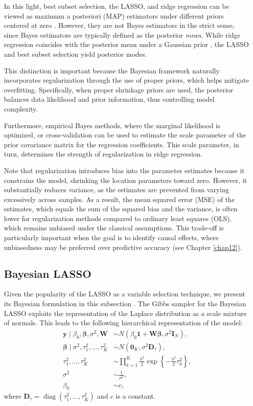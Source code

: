 In this light, best subset selection, the LASSO, and ridge regression can be viewed as maximum a posteriori (MAP) estimators under different priors centered at zero \cite{Park2008}. However, they are not Bayes estimators in the strict sense, since Bayes estimators are typically defined as the posterior \textit{mean}. While ridge regression coincides with the posterior mean under a Gaussian prior \cite{Ishwaran2005}, the LASSO and best subset selection yield posterior modes.

This distinction is important because the Bayesian framework naturally incorporates regularization through the use of proper priors, which helps mitigate overfitting. Specifically, when proper shrinkage priors are used, the posterior balances data likelihood and prior information, thus controlling model complexity.

Furthermore, empirical Bayes methods, where the marginal likelihood is optimized, or cross-validation can be used to estimate the scale parameter of the prior covariance matrix for the regression coefficients. This scale parameter, in turn, determines the strength of regularization in ridge regression.

Note that regularization introduces bias into the parameter estimates because it constrains the model, shrinking the location parameters toward zero. However, it substantially reduces variance, as the estimates are prevented from varying excessively across samples. As a result, the mean squared error (MSE) of the estimates, which equals the sum of the squared bias and the variance, is often lower for regularization methods compared to ordinary least squares (OLS), which remains unbiased under the classical assumptions. This trade-off is particularly important when the goal is to identify causal effects, where unbiasedness may be preferred over predictive accuracy (see Chapter \ref{chap12}).

\subsection{Bayesian LASSO}\label{sec13_21}
Given the popularity of the LASSO as a variable selection technique, we present its Bayesian formulation in this subsection \cite{Park2008}. The Gibbs sampler for the Bayesian LASSO exploits the representation of the Laplace distribution as a scale mixture of normals. This leads to the following hierarchical representation of the model:
\begin{align*}
	\mathbf{y} \mid \beta_0, \boldsymbol{\beta}, \sigma^2, \mathbf{W} &\sim {N}(\beta_0 \mathbf{1} + \mathbf{W} \boldsymbol{\beta}, \sigma^2 \mathbf{I}_N), \\
	\boldsymbol{\beta} \mid \sigma^2, \tau_1^2, \dots, \tau_K^2 &\sim {N}(\mathbf{0}_K, \sigma^2 \mathbf{D}_{\tau}), \\
	\tau_1^2, \dots, \tau_K^2 &\sim \prod_{k=1}^K \frac{\lambda^2}{2} \exp\left\{ -\frac{\lambda^2}{2} \tau_k^2 \right\}, \\
	\sigma^2 &\sim \frac{1}{\sigma^2},\\
	\beta_0&\sim c,
\end{align*}
where $\mathbf{D}_{\tau} = \operatorname{diag}(\tau_1^2, \dots, \tau_K^2)$ and $c$ is a constant. 

